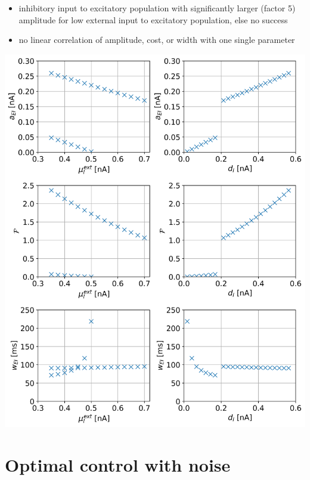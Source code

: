 \documentclass[]{article}
\begin{document}
\begin{minipage}{0.55\textwidth}
	\begin{itemize}
		\item inhibitory input to excitatory population with significantly larger (factor 5) amplitude for low external input to excitatory population, else no success
		\item no linear correlation of amplitude, cost, or width with one single parameter
	\end{itemize}
\end{minipage}
\begin{minipage}{0.43\textwidth}
	\includegraphics[width=\textwidth]{../rate_4.png}
\end{minipage}

\section{Optimal control with noise}
\end{document}
